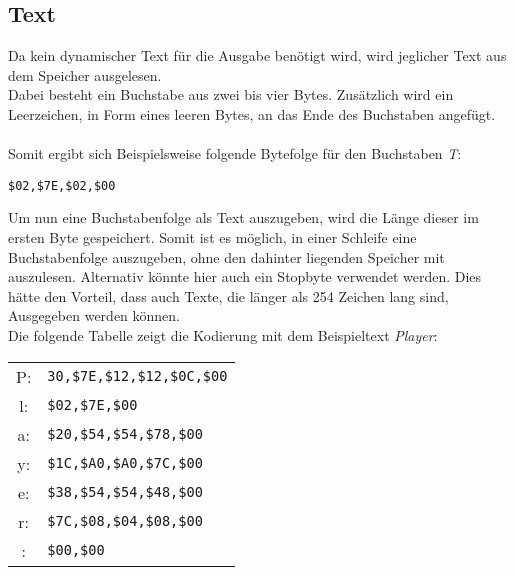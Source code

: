     \subsection{Text}
        Da kein dynamischer Text für die Ausgabe benötigt wird, wird jeglicher Text aus dem Speicher 
        ausgelesen.
        \\
        Dabei besteht ein Buchstabe aus zwei bis vier Bytes. Zusätzlich wird ein Leerzeichen,
        in Form eines leeren Bytes, an das Ende des Buchstaben angefügt.
        \\\\
        Somit ergibt sich Beispielsweise folgende Bytefolge für den Buchstaben \textit{T}:
        \begin{center}
            \texttt{\$02,\$7E,\$02,\$00}    
        \end{center}
        Um nun eine Buchstabenfolge als Text auszugeben, wird die Länge dieser im ersten Byte gespeichert.
        Somit ist es möglich, in einer Schleife eine Buchstabenfolge auszugeben, ohne den dahinter liegenden
        Speicher mit auszulesen. Alternativ könnte hier auch ein Stopbyte verwendet werden.
        Dies hätte den Vorteil, dass auch Texte, die länger als 254 Zeichen lang sind, Ausgegeben werden können.
        \\
        Die folgende Tabelle zeigt die Kodierung mit dem Beispieltext \textit{Player}:
        \begin{center}
            \begin{tabular}{c | l}
                P: & \texttt{30,\$7E,\$12,\$12,\$0C,\$00}\\
                l: & \texttt{\$02,\$7E,\$00} \\
                a: & \texttt{\$20,\$54,\$54,\$78,\$00}\\ 
                y: & \texttt{\$1C,\$A0,\$A0,\$7C,\$00}\\ 
                e: & \texttt{\$38,\$54,\$54,\$48,\$00}\\ 
                r: & \texttt{\$7C,\$08,\$04,\$08,\$00}\\
                 : & \texttt{\$00,\$00}
            \end{tabular}
        \end{center}
      
